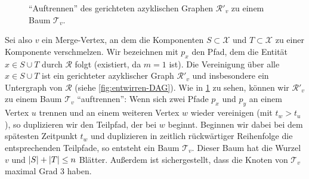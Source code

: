 \begin{beweis}
\begin{figure}
{\label{fig:entwirren-baum}}
		\caption{\enquote{Auftrennen} des gerichteten azyklischen Graphen $\mathcal{R}'_v$ zu einem Baum $\mathcal{T}_v$.}
	\end{figure}
	
	Sei also $v$ ein Merge-Vertex, an dem die Komponenten $S \subset \mathcal{X}$ und $T \subset \mathcal{X}$ zu einer Komponente verschmelzen.
	Wir bezeichnen mit $p_x$ den Pfad, dem die Entität $x \in S \cup T$ durch $\mathcal{R}$ folgt (existiert, da $m=1$ ist).
	Die Vereinigung über alle $x \in S \cup T$ ist ein gerichteter azyklischer Graph $\mathcal{R}'_v$ und insbesondere ein Untergraph von $\mathcal{R}$ (siehe \cref{fig:entwirren-DAG}).
	Wie in \cref{fig:entwirren-baum} zu sehen, können wir $\mathcal{R}'_v$ zu einem Baum $\mathcal{T}_v$ \enquote{auftrennen}:
	Wenn sich zwei Pfade $p_x$ und $p_y$ an einem Vertex $u$ trennen und an einem weiteren Vertex $w$ wieder vereinigen (mit $t_w > t_u$), so duplizieren wir den Teilpfad, der bei $w$ beginnt.
	Beginnen wir dabei bei dem spätesten Zeitpunkt $t_w$ und duplizieren in zeitlich rückwärtiger Reihenfolge die entsprechenden Teilpfade, so entsteht ein Baum $\mathcal{T}_v$.
	Dieser Baum hat die Wurzel $v$ und $\abs*{S}+ \abs*{T} \le n$ Blätter.
	Außerdem ist sichergestellt, dass die Knoten von $\mathcal{T}_v$ maximal Grad 3 haben.
	

\end{beweis}
